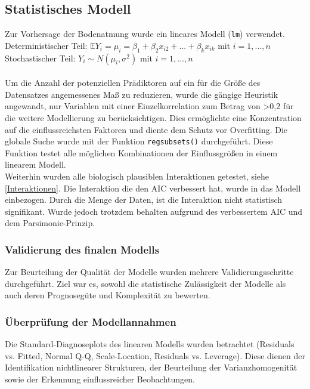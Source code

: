 \subsection{Statistisches Modell}

Zur Vorhersage der Bodenatmung wurde ein lineares Modell (\texttt{lm}) verwendet.\\
Deterministischer Teil: $\mathbb{E}Y_i= \mu_i =\beta_1 + \beta_2x_{i2} + ... + \beta_kx_{ik}$ mit $i= 1,...,n$\\
Stochastischer Teil: $Y_i \sim N(\mu_i, \sigma^2)$ mit $i= 1,...,n$\\
\\ 
Um die Anzahl der potenziellen Prädiktoren auf ein für die Größe des Datensatzes angemessenes Maß zu
reduzieren, wurde die gängige Heuristik angewandt, nur Variablen mit einer Einzelkorrelation zum Betrag
von >0,2 für die weitere Modellierung zu berücksichtigen. Dies ermöglichte eine Konzentration auf die
einflussreichsten Faktoren und diente dem Schutz vor Overfitting.
Die globale Suche wurde mit der Funktion \texttt{regsubsets()} durchgeführt. Diese Funktion testet alle möglichen Kombinationen der
Einflussgrößen in einem linearem Modell.
\\
Weiterhin wurden alle biologisch plausiblen Interaktionen getestet, siehe \ref{Interaktionen}. Die Interaktion die den AIC verbessert hat, wurde
in das Modell einbezogen. Durch die Menge der Daten, ist die Interaktion nicht statistisch signifikant. Wurde jedoch trotzdem behalten aufgrund des verbessertem AIC und dem Parsimonie-Prinzip.

\subsubsection{Validierung des finalen Modells}

Zur Beurteilung der Qualität der Modelle wurden mehrere Validierungsschritte durchgeführt. Ziel war es, sowohl die statistische Zulässigkeit der Modelle als auch deren Prognosegüte und Komplexität zu bewerten.\\

\subsubsection{Überprüfung der Modellannahmen}
Die Standard-Diagnoseplots des linearen Modells wurden betrachtet (Residuals vs. Fitted, Normal Q-Q, Scale-Location, Residuals vs. Leverage). Diese dienen der Identifikation nichtlinearer Strukturen, der Beurteilung der Varianzhomogenität sowie der Erkennung einflussreicher Beobachtungen. \\

